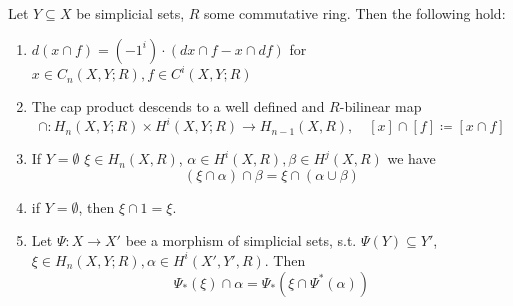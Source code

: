 \documentclass[language=english]{TemplateLecture}
\begin{document}
\begin{proposition}
    Let \(Y \subseteq X\) be simplicial sets, \(R\) some commutative ring. Then the following hold:
    \begin{enumerate}
        \item \(d(x \cap f) = (-1^{i}) \cdot (dx \cap f - x \cap df)\) for \(x \in C_n(X,Y;R), f \in C^{i}(X,Y;R)\)
        \item The cap product descends to a well defined and \(R\)-bilinear map
        \[\cap \colon H_n(X,Y;R) \times H^{i}(X,Y;R) \to H_{n-1}(X,R), \quad [x] \cap [f] \coloneq [x \cap f]\]
        \item If \(Y = \emptyset\) \(\xi \in H_n(X,R)\), \(\alpha \in H^{i}(X,R), \beta \in H^{j}(X,R)\) we have
        \[(\xi \cap \alpha) \cap \beta = \xi \cap (\alpha\cup \beta)\]
        \item if \(Y = \emptyset\), then \(\xi \cap 1 = \xi\).
        \item Let \(\Psi \colon X \to X'\) bee a morphism of simplicial sets, s.t. \(\Psi(Y) \subseteq Y'\), \(\xi \in H_n(X,Y;R), \alpha \in H^{i}(X',Y', R)\). Then
        \[\Psi_*(\xi) \cap \alpha = \Psi_*(\xi \cap \Psi^*(\alpha))\]
    \end{enumerate}
\end{proposition}
\end{document}
